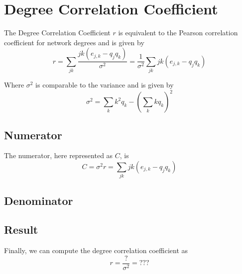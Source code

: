 \section{Degree Correlation Coefficient}

The Degree Correlation Coefficient $r$ is equivalent to the Pearson correlation coefficient for network degrees and is given by
\[
    r = \sum_{j k} \frac{j k \left(e_{j,k} - q_j q_k\right)}{\sigma^2} = \frac{1}{\sigma^2} \sum_{j k} j k \left(e_{j,k} - q_j q_k\right)
    \tag{7.11} \label{eq:coefficient}
\]

Where $\sigma^2$ is comparable to the variance and is given by
\[
    \sigma^2 = \sum_{k} k^2 q_k - \left(\sum_{k} k q_k\right)^2
    \tag{7.12} \label{eq:variance}
\]

\subsection{Numerator}

    The numerator, here represented as $C$, is
    \[
        C = \sigma^2 r = \sum_{j k} j k \left(e_{j,k} - q_j q_k\right)
    \]

\subsection{Denominator}

\subsection{Result}

    Finally, we can compute the degree correlation coefficient as
    \[
        r = \frac{?}{\sigma^2} = ???
    \]
